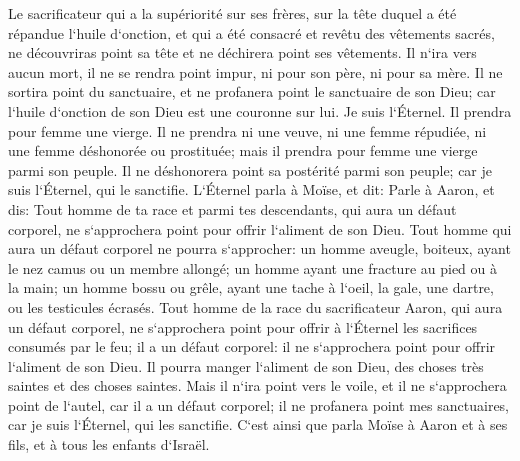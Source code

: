\verse Le sacrificateur qui a la supériorité sur ses frères, sur la tête duquel a été répandue l`huile d`onction, et qui a été consacré et revêtu des vêtements sacrés, ne découvriras point sa tête et ne déchirera point ses vêtements. 
\verse Il n`ira vers aucun mort, il ne se rendra point impur, ni pour son père, ni pour sa mère. 
\verse Il ne sortira point du sanctuaire, et ne profanera point le sanctuaire de son Dieu; car l`huile d`onction de son Dieu est une couronne sur lui. Je suis l`Éternel. 
\verse Il prendra pour femme une vierge. 
\verse Il ne prendra ni une veuve, ni une femme répudiée, ni une femme déshonorée ou prostituée; mais il prendra pour femme une vierge parmi son peuple. 
\verse Il ne déshonorera point sa postérité parmi son peuple; car je suis l`Éternel, qui le sanctifie. 
\verse L`Éternel parla à Moïse, et dit: 
\verse Parle à Aaron, et dis: Tout homme de ta race et parmi tes descendants, qui aura un défaut corporel, ne s`approchera point pour offrir l`aliment de son Dieu. 
\verse Tout homme qui aura un défaut corporel ne pourra s`approcher: un homme aveugle, boiteux, ayant le nez camus ou un membre allongé; 
\verse un homme ayant une fracture au pied ou à la main; 
\verse un homme bossu ou grêle, ayant une tache à l`oeil, la gale, une dartre, ou les testicules écrasés. 
\verse Tout homme de la race du sacrificateur Aaron, qui aura un défaut corporel, ne s`approchera point pour offrir à l`Éternel les sacrifices consumés par le feu; il a un défaut corporel: il ne s`approchera point pour offrir l`aliment de son Dieu. 
\verse Il pourra manger l`aliment de son Dieu, des choses très saintes et des choses saintes. 
\verse Mais il n`ira point vers le voile, et il ne s`approchera point de l`autel, car il a un défaut corporel; il ne profanera point mes sanctuaires, car je suis l`Éternel, qui les sanctifie. 
\verse C`est ainsi que parla Moïse à Aaron et à ses fils, et à tous les enfants d`Israël. 

